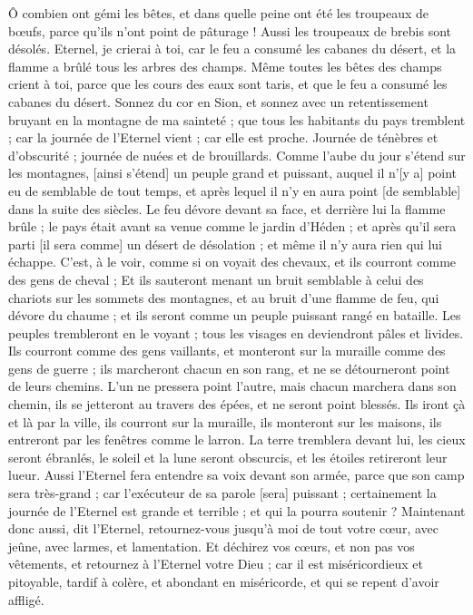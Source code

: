 \begin{multicols}{2}
Ô combien ont gémi les bêtes, et dans quelle peine ont été les troupeaux de bœufs, parce qu'ils n'ont point de pâturage ! Aussi les troupeaux de brebis sont désolés.
Eternel, je crierai à toi, car le feu a consumé les cabanes du désert, et la flamme a brûlé tous les arbres des champs.
Même toutes les bêtes des champs crient à toi, parce que les cours des eaux sont taris, et que le feu a consumé les cabanes du désert.
\VerseOne{}Sonnez du cor en Sion, et sonnez avec un retentissement bruyant en la montagne de ma sainteté ; que tous les habitants du pays tremblent ; car la journée de l'Eternel vient ; car elle est proche.
Journée de ténèbres et d'obscurité ; journée de nuées et de brouillards. Comme l'aube du jour s'étend sur les montagnes, [ainsi s'étend] un peuple grand et puissant, auquel il n'[y a] point eu de semblable de tout temps, et après lequel il n'y en aura point [de semblable] dans la suite des siècles.
Le feu dévore devant sa face, et derrière lui la flamme brûle ; le pays était avant sa venue comme le jardin d'Héden ; et après qu'il sera parti [il sera comme] un désert de désolation ; et même il n'y aura rien qui lui échappe.
C'est, à le voir, comme si on voyait des chevaux, et ils courront comme des gens de cheval ;
Et ils sauteront menant un bruit semblable à celui des chariots sur les sommets des montagnes, et au bruit d'une flamme de feu, qui dévore du chaume ; et ils seront comme un peuple puissant rangé en bataille.
Les peuples trembleront en le voyant ; tous les visages en deviendront pâles et livides.
Ils courront comme des gens vaillants, et monteront sur la muraille comme des gens de guerre ; ils marcheront chacun en son rang, et ne se détourneront point de leurs chemins.
L'un ne pressera point l'autre, mais chacun marchera dans son chemin, ils se jetteront au travers des épées, et ne seront point blessés.
Ils iront çà et là par la ville, ils courront sur la muraille, ils monteront sur les maisons, ils entreront par les fenêtres comme le larron.
La terre tremblera devant lui, les cieux seront ébranlés, le soleil et la lune seront obscurcis, et les étoiles retireront leur lueur.
Aussi l'Eternel fera entendre sa voix devant son armée, parce que son camp sera très-grand ; car l'exécuteur de sa parole [sera] puissant ; certainement la journée de l'Eternel est grande et terrible ; et qui la pourra soutenir ?
Maintenant donc aussi, dit l'Eternel, retournez-vous jusqu'à moi de tout votre cœur, avec jeûne, avec larmes, et lamentation.
Et déchirez vos cœurs, et non pas vos vêtements, et retournez à l'Eternel votre Dieu ; car il est miséricordieux et pitoyable, tardif à colère, et abondant en miséricorde, et qui se repent d'avoir affligé.

\end{multicols}
